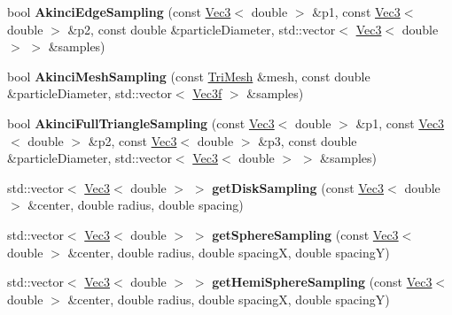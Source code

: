 \begin{DoxyCompactItemize}
\item 
\hypertarget{namespacehokusai_a67b47bd7988118d73174c8d0cabd4ede}{bool {\bfseries Akinci\+Edge\+Sampling} (const \hyperlink{classhokusai_1_1Vec3}{Vec3}$<$ double $>$ \&p1, const \hyperlink{classhokusai_1_1Vec3}{Vec3}$<$ double $>$ \&p2, const double \&particle\+Diameter, std\+::vector$<$ \hyperlink{classhokusai_1_1Vec3}{Vec3}$<$ double $>$ $>$ \&samples)}\label{namespacehokusai_a67b47bd7988118d73174c8d0cabd4ede}

\item 
\hypertarget{namespacehokusai_a7aea1b98c8db12b6b632a2edc83d448b}{bool {\bfseries Akinci\+Mesh\+Sampling} (const \hyperlink{classhokusai_1_1TriMesh}{Tri\+Mesh} \&mesh, const double \&particle\+Diameter, std\+::vector$<$ \hyperlink{classhokusai_1_1Vec3}{Vec3f} $>$ \&samples)}\label{namespacehokusai_a7aea1b98c8db12b6b632a2edc83d448b}

\item 
\hypertarget{namespacehokusai_ae0962ec8adb4bfe40c16dad75512f47f}{bool {\bfseries Akinci\+Full\+Triangle\+Sampling} (const \hyperlink{classhokusai_1_1Vec3}{Vec3}$<$ double $>$ \&p1, const \hyperlink{classhokusai_1_1Vec3}{Vec3}$<$ double $>$ \&p2, const \hyperlink{classhokusai_1_1Vec3}{Vec3}$<$ double $>$ \&p3, const double \&particle\+Diameter, std\+::vector$<$ \hyperlink{classhokusai_1_1Vec3}{Vec3}$<$ double $>$ $>$ \&samples)}\label{namespacehokusai_ae0962ec8adb4bfe40c16dad75512f47f}

\item 
\hypertarget{namespacehokusai_ad45294551c6e496f730f88f0da3330b2}{std\+::vector$<$ \hyperlink{classhokusai_1_1Vec3}{Vec3}$<$ double $>$ $>$ {\bfseries get\+Disk\+Sampling} (const \hyperlink{classhokusai_1_1Vec3}{Vec3}$<$ double $>$ \&center, double radius, double spacing)}\label{namespacehokusai_ad45294551c6e496f730f88f0da3330b2}

\item 
\hypertarget{namespacehokusai_a3937699c13c4925d92e0128514fececa}{std\+::vector$<$ \hyperlink{classhokusai_1_1Vec3}{Vec3}$<$ double $>$ $>$ {\bfseries get\+Sphere\+Sampling} (const \hyperlink{classhokusai_1_1Vec3}{Vec3}$<$ double $>$ \&center, double radius, double spacing\+X, double spacing\+Y)}\label{namespacehokusai_a3937699c13c4925d92e0128514fececa}

\item 
\hypertarget{namespacehokusai_a7dde42067d643a3b73c8c1292aa84dad}{std\+::vector$<$ \hyperlink{classhokusai_1_1Vec3}{Vec3}$<$ double $>$ $>$ {\bfseries get\+Hemi\+Sphere\+Sampling} (const \hyperlink{classhokusai_1_1Vec3}{Vec3}$<$ double $>$ \&center, double radius, double spacing\+X, double spacing\+Y)}\label{namespacehokusai_a7dde42067d643a3b73c8c1292aa84dad}


\end{DoxyCompactItemize}
